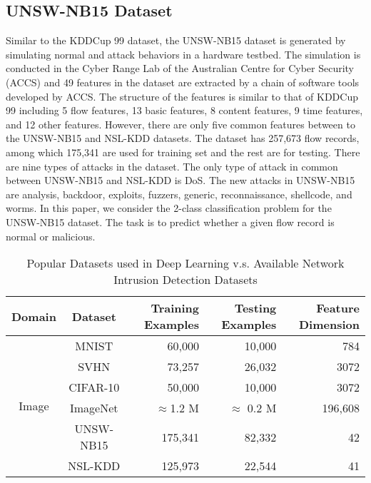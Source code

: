 \subsection{UNSW-NB15 Dataset}
Similar to the KDDCup 99 dataset, the UNSW-NB15 dataset is generated by simulating normal and attack behaviors in a hardware testbed.
The simulation is conducted in the Cyber Range Lab of the Australian Centre for Cyber Security (ACCS) and
49 features in the dataset are extracted by a chain of software tools developed by ACCS.
The structure of the features is similar to that of KDDCup 99 including 5 flow features, 13 basic features, 8 content features, 9 time features, and 12 other features.
However, there are only five common features between to the UNSW-NB15 and NSL-KDD datasets.
The dataset has 257,673 flow records, among which 175,341 are used for
training set and the rest are for testing.
There are nine types of attacks in the dataset.
The only type of attack in common between UNSW-NB15 and NSL-KDD is DoS.
The new attacks in UNSW-NB15 are analysis, backdoor, exploits, fuzzers, generic, reconnaissance, shellcode, and worms.
In this paper, we consider the 2-class classification problem for the UNSW-NB15 dataset. The task is to predict whether a given flow record is normal or malicious.

\begin{table}[ht]
\centering
\caption[Network Intrusion Detection Datasets]{Popular Datasets used in Deep Learning v.s. Available Network Intrusion Detection Datasets}
\label{CDL:Tab:Datasets}
\begin{tabular}{c|c|r|r|r}
\multicolumn{1}{c|}{Domain}                          & Dataset       & Training Examples & Testing Examples & Feature Dimension \\
\hline
\hline
\multirow{6}{*}{Image}                               & MNIST         & 60,000            & 10,000           & 784     \\
                                                     & SVHN          & 73,257            & 26,032           & 3072    \\
                                                     & CIFAR-10      & 50,000            & 10,000           & 3072    \\
                                                     & ImageNet      & $\approx$1.2 M    & $\approx$ 0.2 M  & 196,608 \\
\hline
\multicolumn{1}{c|}{\multirow{2}{*}{NIDS}}           & UNSW-NB15     & 175,341           & 82,332            & 42      \\
\multicolumn{1}{l|}{}                                & NSL-KDD       & 125,973           & 22,544            & 41      
\end{tabular}
\end{table}

